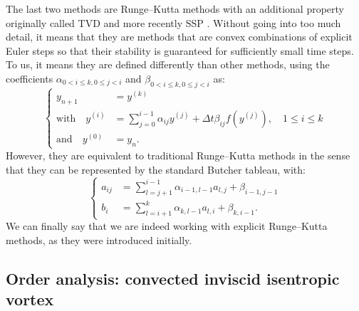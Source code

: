     The last two methods are Runge--Kutta methods with an additional property originally called TVD \cite{GottliebShu1996} and more recently SSP  \cite{GottliebShuTadmor2001}.
    Without going into too much detail, it means that they are methods that are convex combinations of explicit Euler steps so that their stability is guaranteed for sufficiently small time steps.
    To us, it means they are defined differently than other methods, using the coefficients $\alpha_{0 < i \leq k, 0\leq j < i}$ and $\beta_{0 < i \leq k, 0\leq j < i}$ as:
    \begin{equation}
      \left\{\begin{aligned}
        y_{n+1} &= y^{\left(k\right)} \\
        \textrm{with}\quad y^{\left(i\right)} &= \sum_{j = 0}^{i-1} \alpha_{ij} y^{\left(j\right)} + \Delta t \beta_{ij} f\left(y^{\left(j\right)}\right) , \quad 1 \leq i \leq k\\
        \textrm{and}\quad y^{\left(0\right)} &= y_n .
      \end{aligned}\right.
    \end{equation}
    However, they are equivalent to traditional Runge--Kutta methods in the sense that they can be represented by the standard Butcher tableau, with:
    \begin{equation}
      \left\{\begin{aligned}
        a_{ij} &= \sum_{l = j+1}^{i-1} \alpha_{i-1, l-1} a_{l, j} + \beta_{i-1, j-1} \\
        b_i &= \sum_{l = i+1}^{k} \alpha_{k, l-1} a_{l, i} + \beta_{k, i-1} .
      \end{aligned}\right.
    \end{equation}
    We can finally say that we are indeed working with explicit Runge--Kutta methods, as they were introduced initially.


    \subsection{Order analysis: convected inviscid isentropic vortex}

